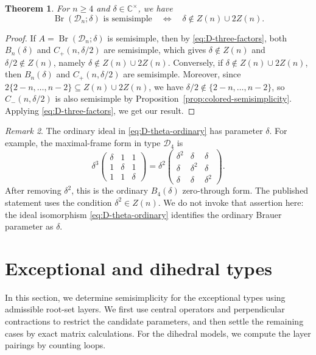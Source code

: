 \documentclass[11pt,a4paper]{amsart}
\newtheorem{theorem}{Theorem}[section]
\theoremstyle{uprightdefinition}
\theoremstyle{remark}\newtheorem{remark}[theorem]{Remark}
\begin{document}
\begin{theorem}\label{thm:D-complete}
For $n\geq4$ and $\delta\in\mathbb C^\times$, we have
\[
 \operatorname{Br}(\mathscr{D}_n;\delta)\text{ is semisimple}
 \quad\Longleftrightarrow\quad
 \delta\notin Z(n)\cup2Z(n).
\]
\end{theorem}
\begin{proof}
If $A=\operatorname{Br}(\mathscr{D}_n;\delta)$ is semisimple, then by \eqref{eq:D-three-factors}, both $B_n(\delta)$ and $C_+(n,\delta/2)$ are semisimple, which gives $\delta\notin Z(n)$ and $\delta/2\notin Z(n)$, namely $\delta\notin Z(n)\cup2Z(n)$.
Conversely, if $\delta\notin Z(n)\cup2Z(n)$, then $B_n(\delta)$ and $C_+(n,\delta/2)$ are semisimple. Moreover, since $2\{2-n,\ldots,n-2\}\subseteq Z(n)\cup2Z(n)$, we have $\delta/2\notin\{2-n,\ldots,n-2\}$, so $C_-(n,\delta/2)$ is also semisimple by Proposition~\ref{prop:colored-semisimplicity}. Applying
\eqref{eq:D-three-factors}, we get our result.
\end{proof}

\begin{remark}
The ordinary ideal in \eqref{eq:D-theta-ordinary} has parameter
$\delta$. For example, the maximal-frame form in type $\mathscr{D}_4$ is
\[
 \delta^3\begin{pmatrix}\delta&1&1\\1&\delta&1\\1&1&\delta\end{pmatrix}
 =\delta^2\begin{pmatrix}\delta^2&\delta&\delta\\
 \delta&\delta^2&\delta\\\delta&\delta&\delta^2\end{pmatrix}.
\]
After removing $\delta^2$, this is the ordinary $B_4(\delta)$
zero-through form. The published statement
\cite[Theorem~5.1(i)]{LiuMorita2025} uses the condition $\delta^2\in Z(n)$.
We do not invoke that assertion here: the ideal isomorphism
\eqref{eq:D-theta-ordinary} identifies the ordinary Brauer parameter as
$\delta$.
\end{remark}


\section{Exceptional and dihedral types}
\label{sec:exceptional-cases}
\label{subsec:type-E}
\label{app:exceptional}

In this section, we determine semisimplicity for the exceptional types using admissible
root-set layers. We first use central operators and perpendicular contractions to restrict
the candidate parameters, and then settle the remaining cases by exact matrix calculations. For the dihedral models, we compute the
layer pairings by counting loops.
\end{document}
